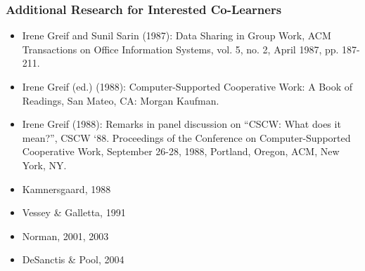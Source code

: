 \subsubsection{Additional Research for Interested Co-Learners}

\begin{itemize}
\item
  Irene Greif and Sunil Sarin (1987): Data Sharing in Group Work, ACM
  Transactions on Office Information Systems, vol. 5, no. 2, April 1987,
  pp. 187-211.
\item
  Irene Greif (ed.) (1988): Computer-Supported Cooperative Work: A Book
  of Readings, San Mateo, CA: Morgan Kaufman.
\item
  Irene Greif (1988): Remarks in panel discussion on ``CSCW: What does
  it mean?'', CSCW `88. Proceedings of the Conference on
  Computer-Supported Cooperative Work, September 26-28, 1988, Portland,
  Oregon, ACM, New York, NY.
\item
  Kamnersgaard, 1988
\item
  Vessey \& Galletta, 1991
\item
  Norman, 2001, 2003
\item
  DeSanctis \& Pool, 2004
\end{itemize}
